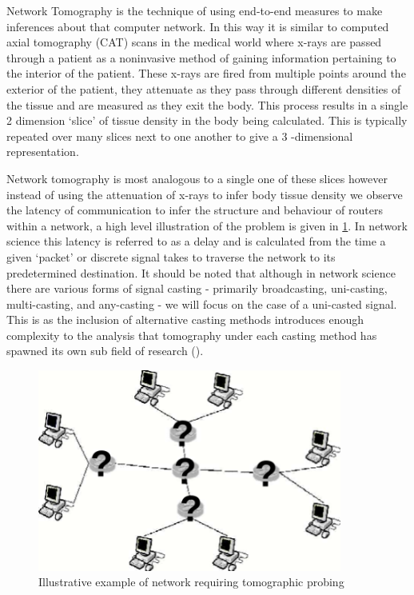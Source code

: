 Network Tomography is the technique of using end-to-end measures to make inferences about that computer network. In this way it is similar to computed axial tomography (CAT) scans in the medical world where x-rays are passed through a patient as a noninvasive method of gaining information pertaining to the interior of the patient. These x-rays are fired from multiple points around the exterior of the patient, they attenuate as they pass through different densities of the tissue and are measured as they exit the body. This process results in a single 2 dimension ‘slice’ of tissue density in the body being calculated. This is typically repeated over many slices next to one another to give a 3 -dimensional representation.\par
Network tomography is most analogous to a single one of these slices however instead of using the attenuation of x-rays to infer body tissue density we observe the latency of communication to infer the structure and behaviour of routers within a network, a high level illustration of the problem is given in \ref{fig:nettom?}. In network science this latency is referred to as a delay and is calculated from the time a given ‘packet’ or discrete signal takes to traverse the network to its predetermined destination. It should be noted that although in network science there are various forms of signal casting - primarily broadcasting, uni-casting, multi-casting, and any-casting - we will focus on the case of a uni-casted signal. This is as the inclusion of alternative casting methods introduces enough complexity to the analysis that tomography under each casting method has spawned its own sub field of research (\cite{lawrence_network_2006}).\par
\begin{figure}
    \centering
    \includegraphics[width=10cm]{figs/intro/nettom-illustration.png}
    \caption[Illustrative example of network requiring tomographic probing]{Illustrative example of network requiring tomographic probing \cite{lawrence_network_2006}}
    \label{fig:nettom?}
\end{figure}


